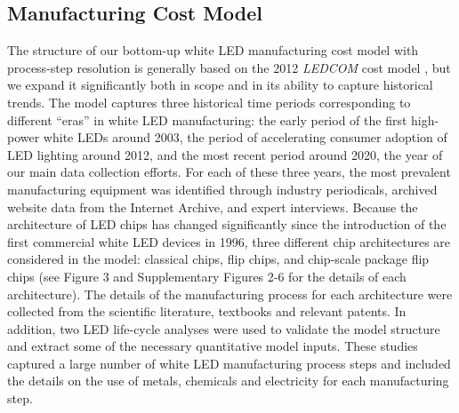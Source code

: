 \documentclass[parskip=full]{article}
\begin{document}
\subsection{Manufacturing Cost Model}

The structure of our bottom-up white LED manufacturing cost model with process-step resolution is generally based on the 2012 \textit{LEDCOM} cost model \cite{ledcomv2}, but we expand it significantly both in scope and in its ability to capture historical trends. The model captures three historical time periods corresponding to different “eras” in white LED manufacturing: the early period of the first high-power white LEDs around 2003, the period of accelerating consumer adoption of LED lighting around 2012, and the most recent period around 2020, the year of our main data collection efforts. For each of these three years, the most prevalent manufacturing equipment was identified through industry periodicals, archived website data from the Internet Archive, and expert interviews. Because the architecture of LED chips has changed significantly since the introduction of the first commercial white LED devices in 1996, three different chip architectures are considered in the model: classical chips, flip chips, and chip-scale package flip chips (see Figure 3 and Supplementary Figures 2-6 for the details of each architecture). The details of the manufacturing process for each architecture were collected from the scientific literature, textbooks and relevant patents. In addition, two LED life-cycle analyses were used to validate the model structure and extract some of the necessary quantitative model inputs. These studies captured a large number of white LED manufacturing process steps and included the details on the use of metals, chemicals and electricity for each manufacturing step.
\end{document}
